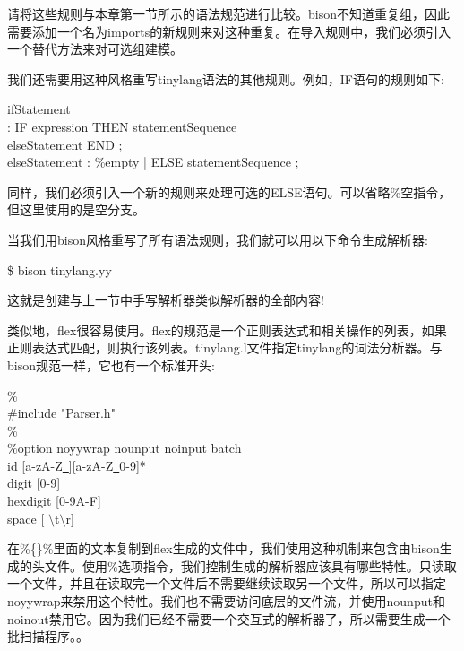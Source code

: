 请将这些规则与本章第一节所示的语法规范进行比较。bison不知道重复组，因此需要添加一个名为imports的新规则来对这种重复。在导入规则中，我们必须引入一个替代方法来对可选组建模。\par

我们还需要用这种风格重写tinylang语法的其他规则。例如，IF语句的规则如下:\par

\begin{tcolorbox}[colback=white,colframe=black]
ifStatement \\
\hspace*{0.5cm}: IF expression THEN statementSequence \\
\hspace*{1cm}elseStatement END ; \\
elseStatement : \%empty | ELSE statementSequence ;
\end{tcolorbox}

同样，我们必须引入一个新的规则来处理可选的ELSE语句。可以省略\%空指令，但这里使用的是空分支。\par

当我们用bison风格重写了所有语法规则，我们就可以用以下命令生成解析器:\par

\begin{tcolorbox}[colback=white,colframe=black]
\$ bison tinylang.yy
\end{tcolorbox}

这就是创建与上一节中手写解析器类似解析器的全部内容!\par

类似地，flex很容易使用。flex的规范是一个正则表达式和相关操作的列表，如果正则表达式匹配，则执行该列表。tinylang.l文件指定tinylang的词法分析器。与bison规范一样，它也有一个标准开头:\par

\begin{tcolorbox}[colback=white,colframe=black]
\%{ \\
\#include "Parser.h" \\
\%} \\
\%option noyywrap nounput noinput batch \\
id [a-zA-Z\underline{~}][a-zA-Z\underline{~}0-9]* \\
digit [0-9] \\
hexdigit [0-9A-F] \\
space [ $\setminus$t$\setminus$r]
\end{tcolorbox}

在\%\{\}\%里面的文本复制到flex生成的文件中，我们使用这种机制来包含由bison生成的头文件。使用\%选项指令，我们控制生成的解析器应该具有哪些特性。只读取一个文件，并且在读取完一个文件后不需要继续读取另一个文件，所以可以指定noyywrap来禁用这个特性。我们也不需要访问底层的文件流，并使用nounput和noinout禁用它。因为我们已经不需要一个交互式的解析器了，所以需要生成一个批扫描程序。。\par

